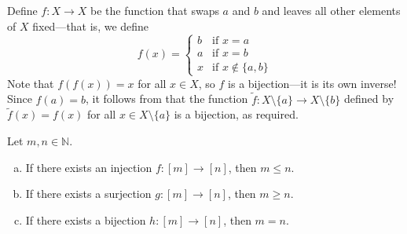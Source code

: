 \begin{cproof}
Define $f : X \to X$ be the function that swaps $a$ and $b$ and leaves all other elements of $X$ fixed---that is, we define
\[ f(x) = \begin{cases} b & \text{if } x = a \\ a & \text{if } x = b \\ x & \text{if } x \not\in \{ a, b \} \end{cases} \]
Note that $f(f(x)) = x$ for all $x \in X$, so $f$ is a bijection---it is its own inverse! Since $f(a) = b$, it follows from  that the function $\tilde{f} : X \setminus \{ a \} \to X \setminus \{ b \}$ defined by $\tilde{f}(x) = f(x)$ for all $x \in X \setminus \{ a \}$ is a bijection, as required.
\end{cproof}

\begin{theorem}
\label{thmJectionsAndSizeOfNaturalNumbers}
Let $m,n \in \mathbb{N}$.
\begin{enumerate}[(a)]
\item If there exists an injection $f : [m] \to [n]$, then $m \le n$.
\item If there exists a surjection $g : [m] \to [n]$, then $m \ge n$.
\item If there exists a bijection $h : [m] \to [n]$, then $m=n$.
\end{enumerate}
\end{theorem}

